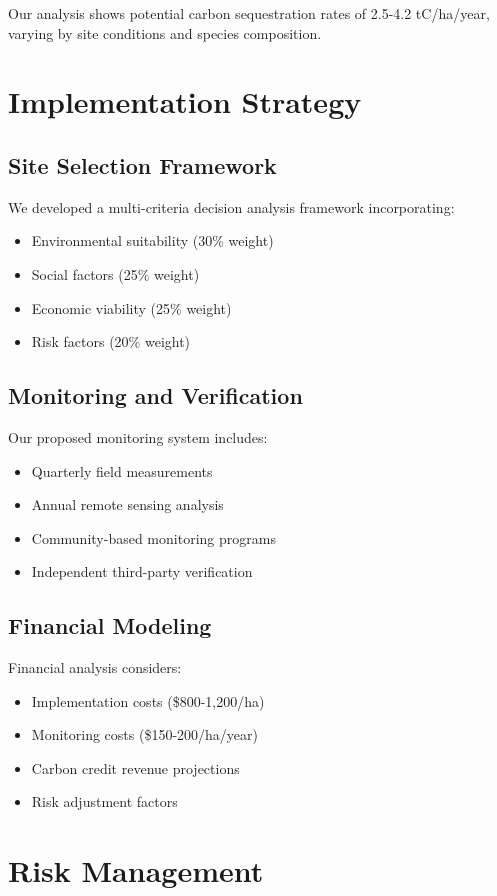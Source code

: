 \documentclass{article}
\theoremstyle{plain}
\theoremstyle{definition}
\theoremstyle{remark}
\begin{document}
Our analysis shows potential carbon sequestration rates of 2.5-4.2 tC/ha/year, varying by site conditions and species composition.

\section{Implementation Strategy}

\subsection{Site Selection Framework}
We developed a multi-criteria decision analysis framework incorporating:
\begin{itemize}
\item Environmental suitability (30\% weight)
\item Social factors (25\% weight)
\item Economic viability (25\% weight)
\item Risk factors (20\% weight)
\end{itemize}

\subsection{Monitoring and Verification}
Our proposed monitoring system includes:
\begin{itemize}
\item Quarterly field measurements
\item Annual remote sensing analysis
\item Community-based monitoring programs
\item Independent third-party verification
\end{itemize}

\subsection{Financial Modeling}
Financial analysis considers:
\begin{itemize}
\item Implementation costs (\$800-1,200/ha)
\item Monitoring costs (\$150-200/ha/year)
\item Carbon credit revenue projections
\item Risk adjustment factors
\end{itemize}

\section{Risk Management}
\end{document}
